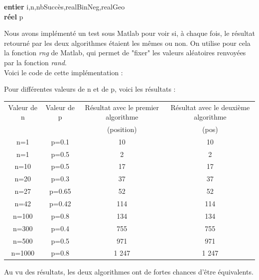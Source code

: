\documentclass{article}
\begin{document}
\begin{algorithm}[H]
	\textbf{entier} i,n,nbSuccès,realBinNeg,realGeo\\
	\textbf{réel} p\\
\end{algorithm}

\bigskip
Nous avons implémenté un test sous Matlab pour voir si, à chaque fois, le résultat retourné par les deux algorithmes étaient les mêmes ou non. On utilise pour cela la fonction \textit{rng} de Matlab, qui permet de "fixer" les valeurs aléatoires renvoyées par la fonction \textit{rand}. \\
Voici le code de cette implémentation :


\newpage
Pour différentes valeurs de n et de p, voici les résultats : \\
\begin{tabular}{|c|c|c|c|}
	\hline
	Valeur de n & Valeur de p & Résultat avec le premier algorithme & Résultat avec le deuxième algorithme\\
	 & & (position) & (pos)\\
	\hline
	n=1 & p=0.1 & 10 & 10 \\
	\hline
	n=1 & p=0.5 & 2 & 2 \\
	\hline
	n=10 & p=0.5 & 17 & 17 \\
	\hline
	n=20 & p=0.3 & 37 & 37 \\
	\hline
	n=27 & p=0.65 & 52 & 52 \\
	\hline
	n=42 & p=0.42 & 114 & 114\\
	\hline
	n=100 & p=0.8 & 134 & 134\\
	\hline
	n=300 & p=0.4 & 755 & 755 \\
	\hline
	n=500 & p=0.5 & 971 & 971\\
	\hline 
	n=1000 & p=0.8 & 1 247 & 1 247 \\
	\hline
\end{tabular}

\bigskip
Au vu des résultats, les deux algorithmes ont de fortes chances d'être équivalents.
\end{document}
